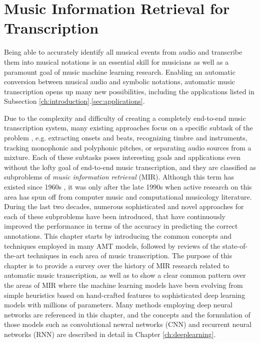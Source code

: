 
\graphicspath{{2-mir/figures/}}

\chapter{Music Information Retrieval for Transcription}
\label{ch:mir}

Being able to accurately identify all musical events from audio and transcribe them into musical notations is an essential skill for musicians as well as a paramount goal of music machine learning research.
Enabling an automatic conversion between musical audio and symbolic notations, automatic music transcription opens up many new possibilities, including the applications listed in Subsection \ref{ch:introduction}.\ref{sec:applications}.


Due to the complexity and difficulty of creating a completely end-to-end music transcription system, many existing approaches focus on a specific subtask of the problem \cite{casey2008mir}, e.g. extracting onsets and beats, recognizing timbre and instruments, tracking monophonic and polyphonic pitches, or separating audio sources from a mixture.
Each of these subtasks poses interesting goals and applications even without the lofty goal of end-to-end music transcription, and they are classified as subproblems of \emph{music information retrieval} (MIR).
Although this term has existed since 1960s \cite{kassler1966mir}, it was only after the late 1990s when active research on this area has spun off from computer music and computational musicology literature.
During the last two decades, numerous sophisticated and novel approaches for each of these subproblems have been introduced, that have continuously improved the performance in terms of the accuracy in predicting the correct annotations.
This chapter starts by introducing the common concepts and techniques employed in many AMT models, followed by reviews of the state-of-the-art techniques in each area of music transcription.
The purpose of this chapter is to provide a survey over the history of MIR research related to automatic music transcription, as well as to show a clear common pattern over the areas of MIR where the machine learning models have been evolving from simple heuristics based on hand-crafted features to sophisticated deep learning models with millions of parameters.
Many methods employing deep neural networks are referenced in this chapter, and the concepts and the formulation of those models such as convolutional newral networks (CNN) and recurrent neural networks (RNN) are described in detail in Chapter \ref{ch:deeplearning}.


